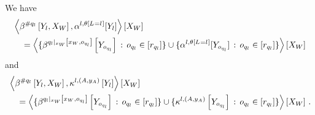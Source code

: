 \begin{lemma}
    We have
    \begin{align*}
        &\left\langle \beta^{\#q_{l}}\left[Y_{l},X_{W}\right],\alpha^{l,\theta\left[L_{}=l_{}\right]}[Y_{l}]\right\rangle \left[ X_{W} \right] \\
        &\quad = \left\langle 
            \{\beta^{{q_{l}}|_{x_{W}} \left[x_{W},o_{q_{l}}\right]}\left[Y_{o_{q_{l}}}\right] \,:\, o_{q_{l}}\in[r_{q_{l}}]\}
            \cup
            \{\alpha^{l,\theta\left[L_{}=l_{}\right]}[Y_{o_{q_{l}}}] \,:\, o_{q_{l}}\in[r_{q_{l}}]\}
        \right\rangle \left[ X_{W} \right]
    \end{align*}
    and
    \begin{align*}
        &\left\langle \beta^{\#q_{l}}\left[Y_{l},X_{W}\right],\kappa^{l,(A,y_{A})}\left[Y_{l}\right]\right\rangle \left[ X_{W} \right] \\
        &\quad = \left\langle 
            \{\beta^{{q_{l}}|_{x_{W}} \left[x_{W},o_{q_{l}}\right]}\left[Y_{o_{q_{l}}}\right] \,:\, o_{q_{l}}\in[r_{q_{l}}]\}
            \cup
            \{\kappa^{l,(A,y_{A})}\left[Y_{o_{q_{l}}}\right] \,:\, o_{q_{l}}\in[r_{q_{l}}]\}
        \right\rangle \left[ X_{W} \right] \, .
    \end{align*}
\end{lemma}
